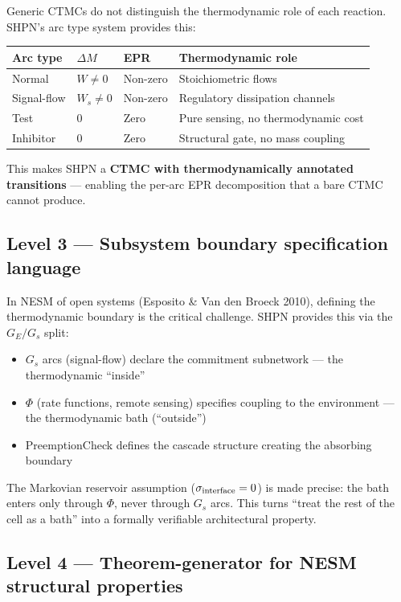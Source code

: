 \documentclass[11pt,a4paper]{article}
\begin{document}
Generic CTMCs do not distinguish the thermodynamic role of each reaction.
SHPN's arc type system provides this:

\begin{center}
\begin{tabular}{p{2.5cm}p{1.8cm}p{2cm}p{4.5cm}}
\toprule
Arc type & $\Delta M$ & EPR & Thermodynamic role \\
\midrule
Normal & $W \neq 0$ & Non-zero & Stoichiometric flows \\
Signal-flow & $W_s \neq 0$ & Non-zero & Regulatory dissipation channels \\
Test & $0$ & Zero & Pure sensing, no thermodynamic cost \\
Inhibitor & $0$ & Zero & Structural gate, no mass coupling \\
\bottomrule
\end{tabular}
\end{center}

This makes SHPN a \textbf{CTMC with thermodynamically annotated transitions}
--- enabling the per-arc EPR decomposition that a bare CTMC cannot produce.

\subsection*{Level 3 — Subsystem boundary specification language}

In NESM of open systems (Esposito \& Van den Broeck 2010), defining the
thermodynamic boundary is the critical challenge.
SHPN provides this via the $G_E/G_s$ split:
\begin{itemize}
  \item $G_s$ arcs (signal-flow) declare the commitment subnetwork ---
    the thermodynamic ``inside''
  \item $\Phi$ (rate functions, remote sensing) specifies coupling to the
    environment --- the thermodynamic bath (``outside'')
  \item PreemptionCheck defines the cascade structure creating the absorbing
    boundary
\end{itemize}
The Markovian reservoir assumption ($\sigma_{\rm interface} = 0$) is made
precise: the bath enters only through $\Phi$, never through $G_s$ arcs.
This turns ``treat the rest of the cell as a bath'' into a formally
verifiable architectural property.

\subsection*{Level 4 — Theorem-generator for NESM structural properties}
\end{document}
